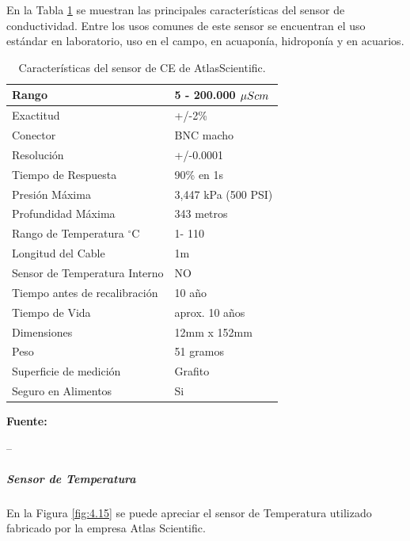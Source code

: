 En la Tabla \ref{tab:caract_ce} se muestran las principales características del sensor de conductividad.
Entre los usos comunes de este sensor se encuentran el uso estándar en laboratorio, uso en el campo, en acuaponía, hidroponía y en acuarios.
\begin{table}[H]
\protect\caption[Características del sensor de CE de AtlasScientific]{Características del sensor de CE de AtlasScientific.}
\label{tab:caract_ce}
\begin{center}
\begin{tabular}{l l}
\hline
Rango    &  5 - 200.000 $\mu S\/cm$\\
\hline
Exactitud      &  +/-2\% \\
\hline
Conector &  BNC macho\\
\hline
Resolución   &  +/-0.0001\\
\hline
Tiempo de Respuesta   &  90\% en 1s\\
\hline
Presión Máxima    &  3,447 kPa (500 PSI) \\
\hline
Profundidad Máxima	& 343 metros\\
\hline
Rango de Temperatura $^{\circ}$C	& 1- 110\\
\hline
Longitud del Cable	& 1m\\
\hline
Sensor de Temperatura Interno	& NO\\
\hline
Tiempo antes de recalibración	& 10 año\\
\hline
Tiempo de Vida	& aprox. 10 años\\
\hline
Dimensiones	& 12mm x 152mm\\
\hline
Peso	& 51 gramos\\
\hline
Superficie de medición	& Grafito\\
\hline
Seguro en Alimentos	& Si\\
\hline
\end{tabular}
\vspace{5mm}
\newline
\hfill \textbf{Fuente:} \cite{atlasce}
\end{center}
\end{table}

--\subparagraph{Sensor de Temperatura}
En la Figura \ref{fig:4.15}  se puede apreciar el sensor de Temperatura utilizado fabricado por la empresa Atlas Scientific.


